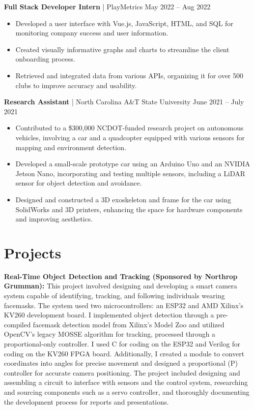 \documentclass[letterpaper,9pt]{article}
\begin{document}
\noindent \textbf{Full Stack Developer Intern} | PlayMetrics \hfill May 2022 – Aug 2022
\begin{itemize}[leftmargin=*,itemsep=0pt,topsep=0pt]
\item Developed a user interface with Vue.js, JavaScript, HTML, and SQL for monitoring company success and user information.
\item Created visually informative graphs and charts to streamline the client onboarding process.
\item Retrieved and integrated data from various APIs, organizing it for over 500 clubs to improve accuracy and usability.
\end{itemize}

\noindent \textbf{Research Assistant} | North Carolina A\&T State University \hfill June 2021 – July 2021
\begin{itemize}[leftmargin=*,itemsep=0pt,topsep=0pt]
\item Contributed to a \$300,000 NCDOT-funded research project on autonomous vehicles, involving a car and a quadcopter equipped with various sensors for mapping and environment detection.
\item Developed a small-scale prototype car using an Arduino Uno and an NVIDIA Jetson Nano, incorporating and testing multiple sensors, including a LiDAR sensor for object detection and avoidance.
\item Designed and constructed a 3D exoskeleton and frame for the car using SolidWorks and 3D printers, enhancing the space for hardware components and improving aesthetics.
\end{itemize}

\section*{Projects}
\noindent \textbf{Real-Time Object Detection and Tracking (Sponsored by Northrop Grumman):} This project involved designing and developing a smart camera system capable of identifying, tracking, and following individuals wearing facemasks. The system used two microcontrollers: an ESP32 and AMD Xilinx’s KV260 development board. I implemented object detection through a pre-compiled facemask detection model from Xilinx’s Model Zoo and utilized OpenCV’s legacy MOSSE algorithm for tracking, processed through a proportional-only controller. I used C for coding on the ESP32 and Verilog for coding on the KV260 FPGA board. Additionally, I created a module to convert coordinates into angles for precise movement and designed a proportional (P) controller for accurate camera positioning. The project included designing and assembling a circuit to interface with sensors and the control system, researching and sourcing components such as a servo controller, and thoroughly documenting the development process for reports and presentations.\\
\end{document}
